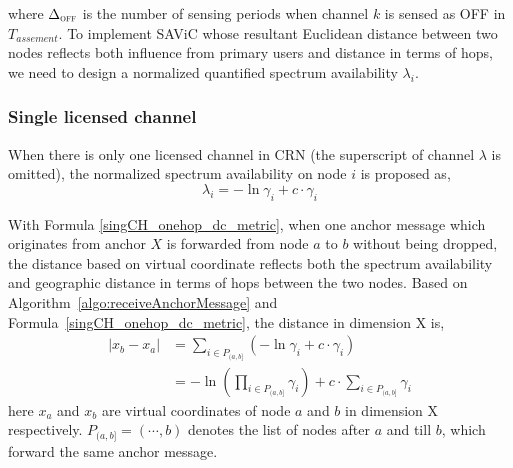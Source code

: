 where $\Delta_{\textsc{\tiny OFF}}$ is the number of sensing periods when channel $k$ is sensed as OFF in $T_{assement}$.
To implement SAViC whose resultant Euclidean distance between two nodes reflects both influence from primary users and distance in terms of hops, we need to design a normalized quantified spectrum availability $\lambda_i$.

\subsubsection*{Single licensed channel}
When there is only one licensed channel in CRN (the superscript of channel $\lambda$ is omitted), the normalized spectrum availability on node $i$ is proposed as,%
\begin{equation}
\lambda_i = -\ln \gamma_i+ c \cdot \gamma_i
\label{singCH_onehop_dc_metric}
\end{equation}

With Formula \ref{singCH_onehop_dc_metric}, when one anchor message which originates from anchor $X$ is forwarded from node $a$ to $b$ without being dropped, the distance based on virtual coordinate reflects both the spectrum availability and geographic distance in terms of hops between the two nodes.
Based on Algorithm~\ref{algo:receiveAnchorMessage} and Formula~\ref{singCH_onehop_dc_metric}, the distance in dimension X is, 
\begin{equation}\label{distance}
\begin{split}
|x_b-x_a| & =  \sum_{i\in P_{(a,b]}} (-\ln\gamma_i + c\cdot \gamma_i) \\
		  & = -\ln(\prod_{i\in P_{(a,b]}} \gamma_i) + c\cdot \sum_{i\in P_{(a,b]}} \gamma_i
\end{split}
\end{equation}
here $x_a$ and $x_b$ are virtual coordinates of node $a$ and $b$ in dimension X respectively.
$P_{(a,b]}=(\cdots, b)$ denotes the list of nodes after $a$ and till $b$, which forward the same anchor message.

